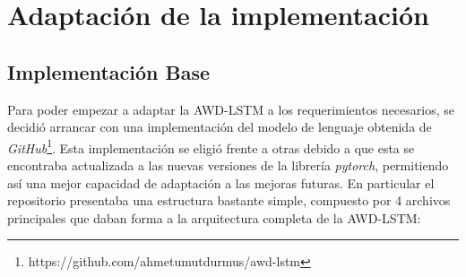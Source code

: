 \chapter{Adaptación de la implementación}

\label{chap:adaptacion}

\section{Implementación Base}

Para poder empezar a adaptar la AWD-LSTM a los requerimientos necesarios, se decidió arrancar con una implementación del modelo de lenguaje obtenida de \textit{GitHub}\footnote{https://github.com/ahmetumutdurmus/awd-lstm}. Esta implementación se eligió frente a otras debido a que esta se encontraba actualizada a las nuevas versiones de la librería \textit{pytorch}, permitiendo así una mejor capacidad de adaptación a las mejoras futuras. En particular el repositorio presentaba una estructura bastante simple, compuesto por 4 archivos principales que daban forma a la arquitectura completa de la AWD-LSTM:

